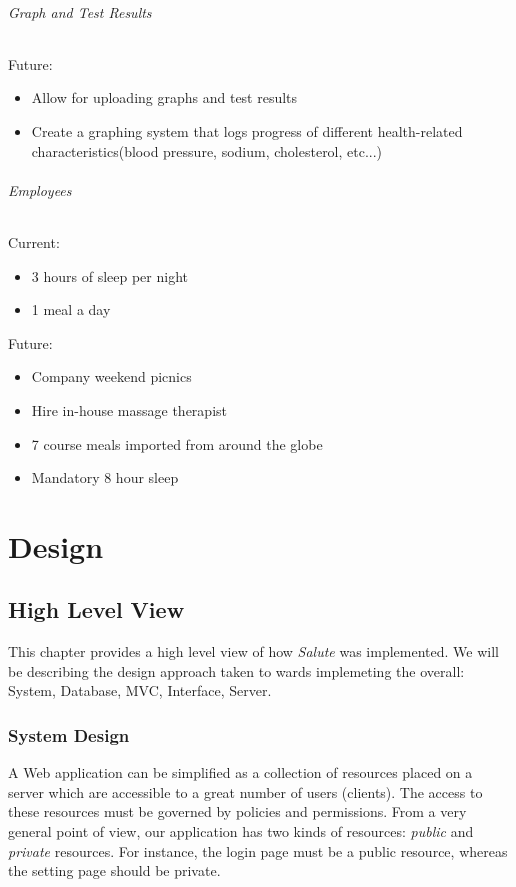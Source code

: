 \documentclass[12pt]{report}
\begin{document}
\paragraph{Graph and Test Results}
Future: 
\begin{itemize}
\item Allow for uploading graphs and test results
\item Create a graphing system that logs progress of different health-related characteristics(blood pressure, sodium, cholesterol, etc...)
\end{itemize}

\paragraph{Employees}

Current:
\begin{itemize}
\item 3 hours of sleep per night
\item 1 meal a day
\end{itemize}

Future:
\begin{itemize}
\item Company weekend picnics
\item Hire in-house massage therapist
\item 7 course meals imported from around the globe
\item Mandatory 8 hour sleep
\end{itemize}

\part{Design}

\chapter{High Level View}
This chapter provides a high level view of how \emph{Salute} was implemented.  We will be describing the design approach taken to wards implemeting the overall: System, Database, MVC, Interface, Server.

\section{System Design}
A Web application can be simplified as a collection of resources placed on a server which are accessible to a great number of users (clients). The access to these resources must be governed by policies and permissions. From a very general point of view, our application has two kinds of resources: \emph{public} and \emph{private} resources. For instance, the login page must be a public resource, whereas the setting page should be private.
\end{document}
